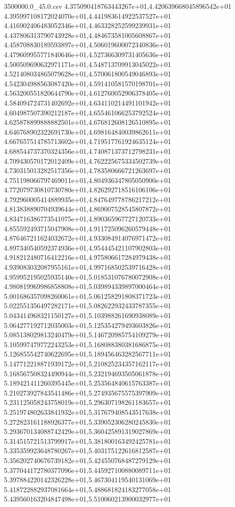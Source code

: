 \begin{filecontents*}{3500000.0_45.0.csv}
4.375090418763443267e+01,4.420639668045896542e+01
4.395997108172024070e+01,4.441983614922537527e+01
4.416902406483052346e+01,4.463328252599239931e+01
4.437806313790743928e+01,4.484673581005608867e+01
4.458708830189593897e+01,4.506019600072340836e+01
4.479609955771840646e+01,4.527366309731405636e+01
4.500509690632971171e+01,4.548713709913045022e+01
4.521408034865079628e+01,4.570061800549046893e+01
4.542304988563087420e+01,4.591410581570198701e+01
4.563200551820644790e+01,4.612760052906378405e+01
4.584094724731402692e+01,4.634110214491101942e+01
4.604987507390212187e+01,4.655461066253792524e+01
4.625878899888882501e+01,4.676812608126510895e+01
4.646768902322691730e+01,4.698164840039862611e+01
4.667657514785713602e+01,4.719517761924635124e+01
4.688544737370324356e+01,4.740871373712798231e+01
4.709430570172012409e+01,4.762225675334502739e+01
4.730315013282517356e+01,4.783580666721263697e+01
4.751198066797469011e+01,4.804936347805050900e+01
4.772079730810730780e+01,4.826292718516106106e+01
4.792960005414889935e+01,4.847649778786217212e+01
4.813838890704939644e+01,4.869007528545807872e+01
4.834716386773541075e+01,4.890365967727120733e+01
4.855592493715047908e+01,4.911725096260579448e+01
4.876467211624032672e+01,4.933084914076971472e+01
4.897340540592374936e+01,4.954445421107902803e+01
4.918212480716412216e+01,4.975806617284979438e+01
4.939083032087955161e+01,4.997168502539716428e+01
4.959952195025935140e+01,5.018531076780072908e+01
4.980819969986858808e+01,5.039894339897000464e+01
5.001686357098260061e+01,5.061258291808371723e+01
5.022551356497282171e+01,5.082622932433787355e+01
5.043414968321150127e+01,5.103988261690938089e+01
5.064277192712035003e+01,5.125354279493603826e+01
5.085138029813240479e+01,5.146720985754109279e+01
5.105997479772243253e+01,5.168088380381686875e+01
5.126855542740622695e+01,5.189456463282567711e+01
5.147712218871939172e+01,5.210825234357162117e+01
5.168567508324490944e+01,5.232194693505061878e+01
5.189421411260395445e+01,5.253564840615763387e+01
5.210273927843541486e+01,5.274935675575397909e+01
5.231125058243758019e+01,5.296307198261183657e+01
5.251974802633841932e+01,5.317679408543517638e+01
5.272823161188926377e+01,5.339052306280245830e+01
5.293670134088742429e+01,5.360425891319027869e+01
5.314515721513799917e+01,5.381800163492425781e+01
5.335359923648780267e+01,5.403175122616812587e+01
5.356202740676739182e+01,5.424550768487279129e+01
5.377044172780377096e+01,5.445927100880089711e+01
5.397884220142326228e+01,5.467304119540131069e+01
5.418722882937081664e+01,5.488681824183277058e+01
5.439560163204847498e+01,5.510060213900032977e+01

\end{filecontents*}
